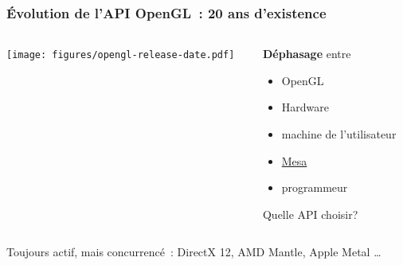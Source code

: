 \begin{frame}
  \frametitle{Évolution de l'API OpenGL~: 20 ans d'existence}
  \begin{columns}
    \begin{column}{.7\textwidth}
      \begin{center}
        \texttt{[image: figures/opengl-release-date.pdf]} %
      \end{center}
    \end{column}
    \begin{column}{.3\textwidth}
      \textbf{Déphasage} entre \\
      \begin{itemize}
      \item OpenGL
      \item Hardware
      \item machine de l'utilisateur
      \item \href{http://www.mesa3d.org}{Mesa}
      \item programmeur
      \end{itemize}
      \alert{Quelle API choisir?}
    \end{column}
  \end{columns}
    \begin{center}
      \alert{Toujours actif, mais concurrencé~: DirectX 12, AMD Mantle, Apple Metal \ldots}
    \end{center}
\end{frame}

